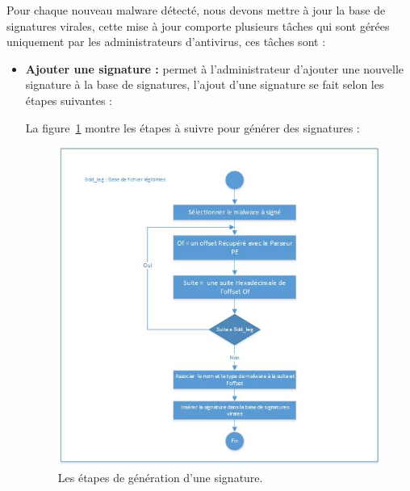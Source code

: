 Pour chaque nouveau malware détecté, nous devons mettre à jour la base de signatures virales, cette mise à jour  comporte plusieurs tâches qui sont gérées uniquement par les administrateurs d'antivirus, ces tâches sont :
\begin{itemize}

\item \textbf{Ajouter une signature : }permet à l'administrateur d'ajouter une nouvelle  signature à la base de signatures, l'ajout d'une signature se fait selon les étapes suivantes :
La figure~\ref{fig :generation} montre les étapes à suivre pour générer des signatures :
\begin{figure}[H]
\begin{center}
\includegraphics[scale=0.7]{Figures/generation.jpg}
\caption{Les étapes de génération d'une signature.}
\label{fig :generation} 
\end{center}
\end{figure}


\end{itemize}
